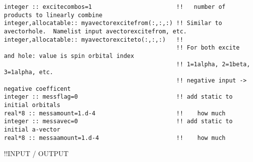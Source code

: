 \begin{verbatim}
integer :: excitecombos=1                        !!   number of products to linearly combine
integer,allocatable:: myavectorexcitefrom(:,:,:) !! Similar to avectorhole.  Namelist input avectorexcitefrom, etc.
integer,allocatable:: myavectorexciteto(:,:,:)   !!
                                                 !! For both excite and hole: value is spin orbital index
                                                 !! 1=1alpha, 2=1beta, 3=1alpha, etc.
                                                 !! negative input -> negative coefficent
integer :: messflag=0                            !! add static to initial orbitals
real*8 :: messamount=1.d-4                       !!    how much
integer :: messavec=0                            !! add static to initial a-vector
real*8 :: messaamount=1.d-4                      !!    how much
\end{verbatim}
!!{\large \quad INPUT / OUTPUT }
